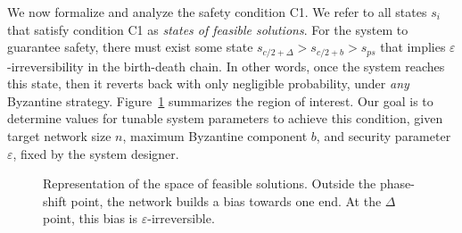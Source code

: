 \documentclass[letterpaper,twocolumn,10pt]{article}
\newcommand{\tronly}[2]{#1}
\theoremstyle{definition}
\newcommand{\Jon}[1]{{\color{blue} \textbf{Jon: } #1}}
\begin{document}
\begin{appendices}
We now formalize and analyze the safety condition C1. We refer to all states $s_i$ that satisfy condition C1 as \emph{states of feasible solutions}. 
For the system to guarantee safety, there must exist some state $s_{c/2 + \Delta} > s_{c/2 + b} > s_{ps}$ that implies $\varepsilon$-irreversibility in the birth-death chain.
In other words, once the system reaches this state, then it reverts back with only negligible probability, under \emph{any} Byzantine strategy. Figure~\ref{fig:states_feasible_solutions} summarizes the region of interest.
Our goal is to determine values for tunable system parameters to achieve this condition, given target network size $n$, maximum Byzantine component $b$, and security parameter $\varepsilon$, fixed by the system designer.

\begin{figure}[h]
    \begin{center}

\caption{Representation of the space of feasible solutions. Outside the phase-shift point, the network builds a bias towards one end. At the $\Delta$ point, this bias is $\varepsilon$-irreversible.
}
\label{fig:states_feasible_solutions}
    \end{center}
\end{figure}


\end{appendices}
\end{document}
